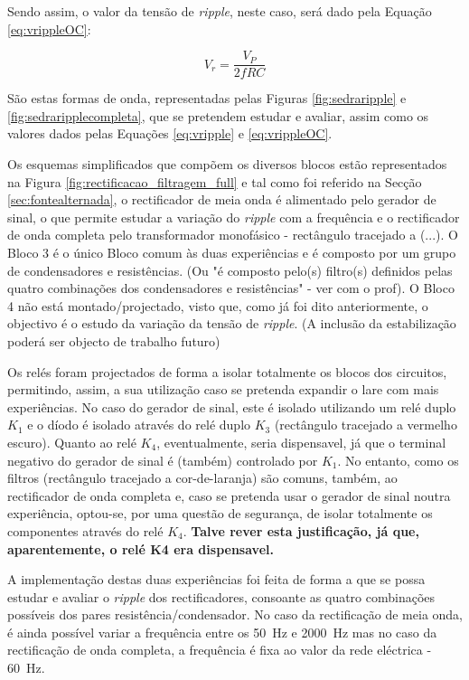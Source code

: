 Sendo assim, o valor da tensão de \textit{ripple}, neste caso, será dado pela Equação \ref{eq:vrippleOC}:

\begin{equation} \label{eq:vrippleOC}
	V_{r} = \frac{V_{P}}{2fRC}
\end{equation}

São estas formas de onda, representadas pelas Figuras \ref{fig:sedraripple} e \ref{fig:sedraripplecompleta}, que se pretendem estudar e avaliar, assim como os valores dados pelas Equações \ref{eq:vripple} e \ref{eq:vrippleOC}.

Os esquemas simplificados que compõem os diversos blocos estão representados na Figura \ref{fig:rectificacao_filtragem_full} e tal como foi referido na Secção \ref{sec:fontealternada}, o rectificador de meia onda é alimentado pelo gerador de sinal, o que permite estudar a variação do \textit{ripple} com a frequência e o rectificador de onda completa pelo transformador monofásico - rectângulo tracejado a (...). O Bloco 3 é o único Bloco comum às duas experiências e é composto por um grupo de condensadores e resistências. (Ou "é composto pelo(s) filtro(s) definidos pelas quatro combinações dos condensadores e resistências" - ver com o prof). O Bloco 4 não está montado/projectado, visto que, como já foi dito anteriormente, o objectivo é o estudo da variação da tensão de \textit{ripple}. (A inclusão da estabilização poderá ser objecto de trabalho futuro)

Os relés foram projectados de forma a isolar totalmente os blocos dos circuitos, permitindo, assim, a sua utilização caso se pretenda expandir o \acrshort{lare} com mais experiências. No caso do gerador de sinal, este é isolado utilizando um relé duplo $K_{1}$ e o díodo é isolado através do relé duplo $K_{3}$ (rectângulo tracejado a vermelho escuro). Quanto ao relé $K_{4}$, eventualmente, seria dispensavel, já que o terminal negativo do gerador de sinal é (também) controlado por $K_{1}$. No entanto, como os filtros (rectângulo tracejado a cor-de-laranja) são comuns,  também, ao rectificador de onda completa e, caso se pretenda usar o gerador de sinal noutra experiência, optou-se, por uma questão de segurança, de isolar totalmente os componentes através do relé $K_{4}$. \textbf{Talve rever esta justificação, já que, aparentemente, o relé K4 era dispensavel.}

A implementação destas duas experiências foi feita de forma a que se possa estudar e avaliar o \textit{ripple} dos rectificadores, consoante as quatro combinações possíveis dos pares resistência/condensador. No caso da rectificação de meia onda, é ainda possível variar a frequência entre os \SI{50}{\hertz} e \SI{2000}{\hertz} mas no caso da rectificação de onda completa, a frequência é fixa ao valor da rede eléctrica - \SI{60}{\hertz}.

